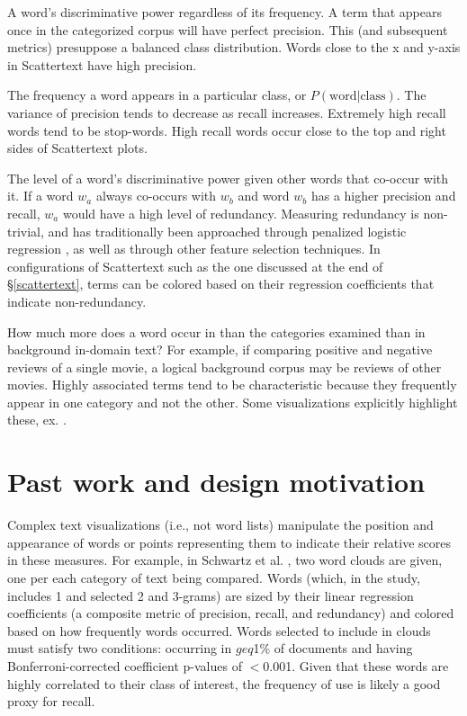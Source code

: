 \documentclass[11pt,a4paper]{article}
\begin{document}
\begin{description}[style=unboxed,leftmargin=0cm]
\item[Precision] A word's discriminative power regardless of its frequency.  A term that appears once in the categorized corpus will have perfect precision. This (and subsequent metrics) presuppose a balanced class distribution.  Words close to the x and y-axis in Scattertext have high precision.  \vspace{-0.1in}
\item[Recall] The frequency a word appears in a particular class, or $P(\mbox{word}|\mbox{class})$.  The variance of precision tends to decrease as recall increases.  Extremely high recall words tend to be stop-words.  High recall words occur close to the top and right sides of Scattertext plots.  \vspace{-0.1in}
\item[Non-redundancy] The level of a word's discriminative power given other words that co-occur with it.  If a word $w_a$ always co-occurs with $w_b$ and word $w_b$ has a higher precision and recall, $w_a$ would have a high level of redundancy. Measuring redundancy is non-trivial, and has traditionally been approached through penalized logistic regression \cite{joshi2010}, as well as through other feature selection techniques.  In configurations of Scattertext such as the one discussed at the end of \S\ref{scattertext}, terms can be colored based on their regression coefficients that indicate non-redundancy.  \vspace{-0.1in}
\item[Characteristicness] How much more does a word occur in than the categories examined than in background in-domain text?  For example, if comparing positive and negative reviews of a single movie, a logical background corpus may be reviews of other movies. Highly associated terms tend to be characteristic because they frequently appear in one category and not the other. Some visualizations explicitly highlight these, ex. \cite{vennclouds}. \vspace{-0.1in}
\end{description}
\section{Past work and design motivation}
\label{pastwork}
Complex text visualizations (i.e., not word lists) manipulate the position and appearance of words or points representing them to indicate their relative scores in these measures. For example, in Schwartz et al. , two word clouds are given, one per each category of text being compared.  Words (which, in the study, includes 1 and selected 2 and 3-grams) are sized by their linear regression coefficients (a composite metric of precision, recall, and redundancy) and colored based on how frequently words occurred.  Words selected to include in clouds must satisfy two conditions: occurring in $geq$1\% of documents and having Bonferroni-corrected coefficient p-values of $<$0.001. Given that these words are highly correlated to their class of interest, the frequency of use is likely a good proxy for recall.
\end{document}
